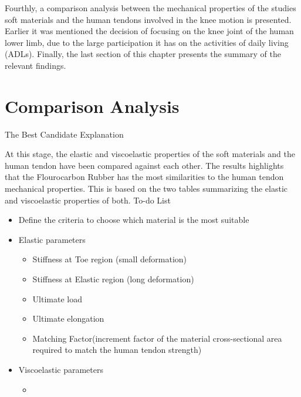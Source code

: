 Fourthly, a comparison analysis between the mechanical properties of the studies soft materials and the human tendons involved in the knee motion is presented. Earlier it was mentioned the decision of focusing on the knee joint of the human lower limb, due to the large participation it has on the activities of daily living (ADLs). Finally, the last section of this chapter presents the summary of the relevant findings.


\section{Comparison Analysis}




{\huge The Best Candidate Explanation}

At this stage, the elastic and viscoelastic properties of the soft materials and the human tendon have been compared against each other. The results highlights that the Flourocarbon Rubber  has the most similarities to the human tendon mechanical properties. This is based on the two tables summarizing the elastic and viscoelastic properties of both.
To-do List
\begin{itemize}
    \item Define the criteria to choose which material is the most suitable
    \item Elastic parameters
    \begin{itemize}
        \item Stiffness at Toe region (small deformation)
        \item Stiffness at Elastic region (long deformation)
        \item Ultimate load
        \item Ultimate elongation
        \item Matching Factor(increment factor of the material cross-sectional area required to match the human tendon strength)
        
    \end{itemize}
    \item Viscoelastic parameters
    \begin{itemize}
        \item 
    \end{itemize}
\end{itemize}
